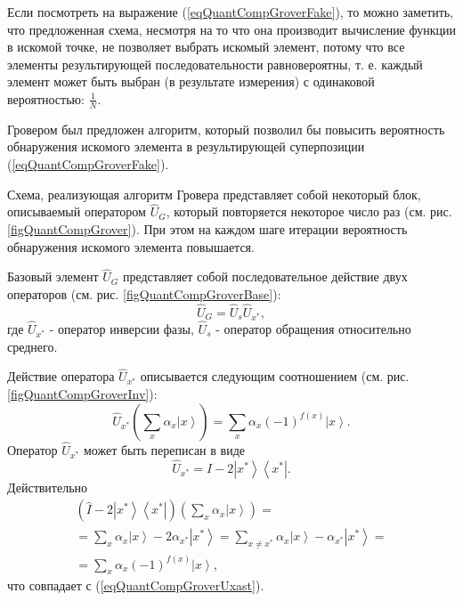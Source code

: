 

Если посмотреть на выражение (\ref{eqQuantCompGroverFake}), то можно
заметить, что предложенная схема, несмотря на то что она производит
вычисление функции в искомой точке, не позволяет выбрать искомый
элемент, потому что все элементы результирующей последовательности
равновероятны, т. е. каждый элемент может быть выбран (в результате
измерения) с одинаковой вероятностью: $\frac{1}{N}$.

Гровером был предложен алгоритм, который позволил бы повысить
вероятность обнаружения искомого элемента в результирующей
суперпозиции (\ref{eqQuantCompGroverFake}).





Схема, реализующая алгоритм Гровера представляет собой некоторый блок,
описываемый оператором $\hat{U}_G$, который повторяется некоторое число
раз (см. рис. \ref{figQuantCompGrover}). При этом на каждом шаге
итерации вероятность обнаружения искомого элемента повышается. 

Базовый элемент $\hat{U}_G$ представляет собой последовательное действие
двух операторов (см. рис. \ref{figQuantCompGroverBase}):
\begin{equation}
\hat{U}_G=\hat{U}_s\hat{U}_{x^{\ast}},
\nonumber
\end{equation}
где $\hat{U}_{x^{\ast}}$ - оператор инверсии фазы, $\hat{U}_s$
- оператор обращения относительно среднего.



Действие оператора $\hat{U}_{x^{\ast}}$ описывается следующим соотношением
(см. рис. \ref{figQuantCompGroverInv}):
\begin{equation}
\hat{U}_{x^{\ast}}\left(\sum_x \alpha_x \left|x\right>\right) = 
\sum_x \alpha_x \left(-1\right)^{f\left(x\right)}\left|x\right>.
\label{eqQuantCompGroverUxast}
\end{equation} 
Оператор $\hat{U}_{x^{\ast}}$ может быть переписан в виде
\begin{equation}
\hat{U}_{x^{\ast}} = \hat{I} - 2 \left|x^{\ast}\right>\left<x^{\ast}\right|.
\nonumber
\end{equation} 
Действительно
\begin{eqnarray}
\left(\hat{I} - 2 \left|x^{\ast}\right>\left<x^{\ast}\right|\right)
\left(\sum_x \alpha_x \left|x\right>\right) =
\nonumber \\
= \sum_x \alpha_x \left|x\right> - 2 \alpha_{x^{\ast}}
\left|x^{\ast}\right> = 
\sum_{x\ne x^{\ast}} \alpha_x \left|x\right> -  \alpha_{x^{\ast}}
\left|x^{\ast}\right> =
\nonumber \\
=
\sum_x \alpha_x \left(-1\right)^{f\left(x\right)}\left|x\right>,
\nonumber
\end{eqnarray}
что совпадает с (\ref{eqQuantCompGroverUxast}).

